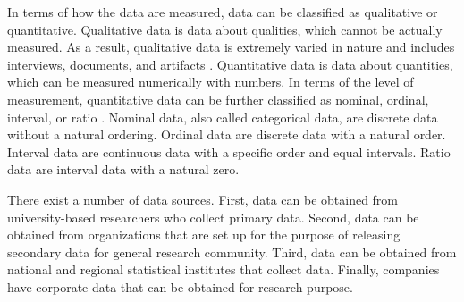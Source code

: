 \documentclass[12pt]{article}
\begin{document}
In terms of how the data are measured, data can be classified as qualitative or quantitative. Qualitative data is data about qualities, which cannot be actually measured. As a result, qualitative data is extremely varied in nature and includes interviews, documents, and artifacts \citep{miles2014}. Quantitative data is data about quantities, which can be measured numerically with numbers. In terms of the level of measurement, quantitative data can be further classified as nominal, ordinal,  interval, or ratio \citep{gan2011}. Nominal data, also called categorical data, are discrete data without a natural ordering. Ordinal data are discrete data with a natural order. Interval data are continuous data with a specific order and equal intervals. Ratio data are interval data with a natural zero. 

There exist a number of data sources. First, data can be obtained from university-based researchers who collect primary data. Second, data can be obtained from organizations that are set up for the purpose of releasing secondary data for general research community. Third, data can be obtained from national and regional statistical institutes that collect data. Finally, companies have corporate data that can be obtained for research purpose.
\end{document}
